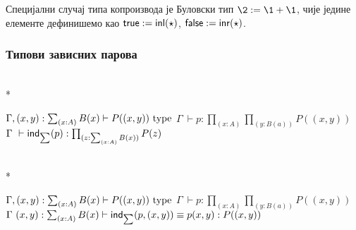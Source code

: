 \documentclass[12pt,oneside]{memoir}
\begin{document}
Специјални случај типа копроизвода је Буловски тип $\2 := \1 + \1$, чије једине елементе дефинишемо као $\mathsf{true} := \mathsf{inl} (\star)$, $\mathsf{false} := \mathsf{inr} (\star)$.

\subsubsection{Типови зависних парова}

\begin{samepage}
    \begin{center}
        \begin{minipage}{.40\textwidth}
            \begin{prooftree}
            \end{prooftree}
        \end{minipage}
        \begin{minipage}{.45\textwidth}
            \begin{prooftree}
            \end{prooftree}
        \end{minipage}
        \\*
        \bigskip%
        \begin{minipage}{\textwidth}
            \begin{prooftree}
                \def\fCenter{\Gamma}
                \Axiom$\fCenter, (x, y) : \sum_{(x : A)} B(x) \vdash P((x, y))~\type$
                \noLine%
                \UnaryInf$\fCenter\ \vdash p : \prod_{(x : A)} \prod_{(y : B(a))} P((x, y))$
                \UnaryInf$\fCenter\ \vdash \ind{\sum} (p) : \prod_{(z : \sum_{(x:A)} B(x))} P(z)$
            \end{prooftree}
        \end{minipage}
        \\*
        \bigskip%
        \begin{minipage}{\textwidth}
            \begin{prooftree}
                \def\fCenter{\Gamma}
                \Axiom$\fCenter, (x, y) : \sum_{(x : A)} B(x) \vdash P((x, y))~\type$
                \noLine%
                \UnaryInf$\fCenter\ \vdash p : \prod_{(x : A)} \prod_{(y : B(a))} P((x, y))$
                \UnaryInf$\fCenter\ (x, y) : \sum_{(x : A)} B(x) \vdash \ind{\sum} (p, (x, y)) \equiv p(x, y) : P((x, y))$
            \end{prooftree}
        \end{minipage}
    \end{center}
\end{samepage}
\end{document}
